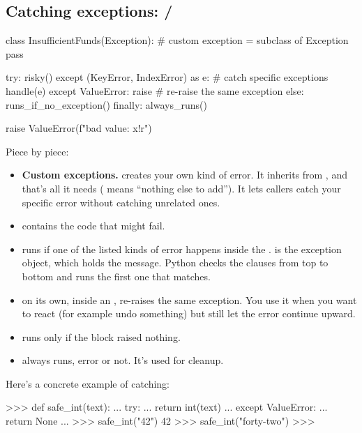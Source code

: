 \documentclass[10pt,a4paper]{article}
\begin{document}
\subsection{Catching exceptions:  / }
\begin{pycode}
class InsufficientFunds(Exception):     # custom exception = subclass of Exception
    pass

try:
    risky()
except (KeyError, IndexError) as e:     # catch specific exceptions
    handle(e)
except ValueError:
    raise                               # re-raise the same exception
else:
    runs_if_no_exception()
finally:
    always_runs()

raise ValueError(f"bad value: {x!r}")
\end{pycode}
Piece by piece:
\begin{itemize}
\item \textbf{Custom exceptions.}  creates your own kind of error. It inherits from , and that’s all it needs ( means “nothing else to add”). It lets callers catch your specific error without catching unrelated ones.
\item \textbf{} contains the code that might fail.
\item \textbf{} runs if one of the listed kinds of error happens inside the .  is the exception object, which holds the message. Python checks the  clauses from top to bottom and runs the first one that matches.
\item \textbf{} on its own, inside an , re-raises the same exception. You use it when you want to react (for example undo something) but still let the error continue upward.
\item \textbf{} runs only if the  block raised nothing.
\item \textbf{} always runs, error or not. It’s used for cleanup.
\end{itemize}
Here’s a concrete example of catching:
\begin{txtcode}
>>> def safe_int(text):
...     try:
...         return int(text)
...     except ValueError:
...         return None
...
>>> safe_int("42")
42
>>> safe_int("forty-two")
>>>
\end{txtcode}
\end{document}
